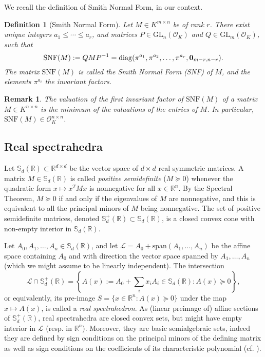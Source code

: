 \documentclass[a4paper,oneside,11pt]{article}
\newtheorem{definition}[theorem]{Definition}
\newtheorem{remark}[theorem]{Remark}
\newcommand{\R}{\mathbb{R}} %
\newcommand{\sym}{\mathbb{S}} %
\renewcommand{\span}[1]{{\text{span}(#1)}} %
\newcommand{\calL}{\mathcal{L}} %
\newcommand{\OK}{\mathcal{O}_K}
\def\diag{\mathrm{diag}}
\newcommand{\GL}{\mathrm{GL}}
\begin{document}
We recall the definition of Smith Normal Form, in our context.
\begin{definition}[Smith Normal Form]\label{smith_nf}
  Let $M \in K^{m \times n}$ be of rank $r$. There exist unique integers $a_1 \leq \cdots \leq a_r$, and
  matrices $P \in \GL_n(\OK)$ and $Q \in \GL_m(\OK)$, such that
  $$
  \mathrm{SNF}(M) := QMP^{-1} = \diag(\pi^{a_1}, \pi^{a_2}, \ldots, \pi^{a_r}, {\bf 0}_{m-r,n-r}).
  $$
  The matrix $\mathrm{SNF}(M)$ is called the \emph{Smith Normal Form (SNF)} of $M$, and the elements $\pi^{a_i}$ the
  \emph{invariant factors}.
\end{definition}
\begin{remark}
  The valuation of the first invariant factor of $\mathrm{SNF}(M)$ of a matrix
  $M \in K^{n \times n}$ is the minimum of the valuations of the entries of
  $M$. In particular, $\mathrm{SNF}(M) \in \OK^{n \times n}$.
\end{remark}


\subsection{Real spectrahedra}

Let $\sym_d(\R) \subset \R^{d\times d}$ be the vector space of $d \times d$ real symmetric
matrices. A matrix $M \in \sym_d(\R)$
is called \emph{positive semidefinite} ($M \succeq 0$) whenever the quadratic
form $x \mapsto x^TMx$ is nonnegative for all $x\in \R^n$. By the Spectral Theorem, $M \succeq 0$
if and only if the eigenvalues of $M$ are nonnegative, and this is equivalent to all the principal minors
of $M$ being nonnegative. The set of positive semidefinite matrices, denoted $\sym_d^+(\R) \subset \sym_d(\R)$,
is a closed convex cone with non-empty interior in $\sym_d(\R)$.

Let $A_0,A_1,\ldots,A_n \in \sym_d(\R)$, and let $\calL = A_0+\span{A_1,\ldots,A_n}$ be the affine space
containing $A_0$ and with direction the vector space spanned by $A_1,\ldots,A_n$ (which we might assume
to be linearly independent). The intersection
$$
\calL \cap \sym_d^+(\R) = \left\{A(x) := A_0+\sum_i x_i A_i \in \sym_d(\R) :
A(x) \succeq 0\right\},
$$
or equivalently, its pre-image $S = \{x \in \R^n : A(x) \succeq 0\}$ under the map $x \mapsto A(x)$, is called
a \emph{real spectrahedron}. As (linear preimage of) affine sections of $\sym_d^+(\R)$, real spectrahedra
are closed convex sets, but might have empty interior in $\calL$ (resp. in $\R^n$).
Moreover, they are basic semialgebraic sets, indeed they are defined by sign conditions on the principal
minors of the defining matrix as well as sign conditions on the coefficients of its characteristic polynomial
(cf. ).
\end{document}
